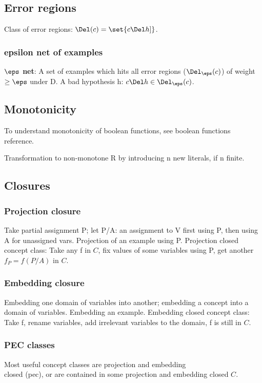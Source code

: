 \documentclass[oneside, article]{memoir}
\begin{document}
\subsection{Error regions}
Class of error regions: $\Del(c)=\set{c \Del h]}$.

\subsubsection{epsilon net of examples}
\textbf{$\eps$ net}: A set of examples which hits all error regions ($\Del_{\eps}(c)$) of weight $\geq \eps$ under D. A bad hypothesis h: $c \Del h \in \Del_{\eps}(c)$.

\subsection{Monotonicity}
To understand monotonicity of boolean functions, see boolean functions reference.

Transformation to non-monotone R by introducing n new literals, if n finite.

\subsection{Closures}
\subsubsection{Projection closure}
Take partial assignment P; let P/A: an assignment to V first using P, then using A for unassigned vars. Projection of an example using P. Projection closed concept class: Take any f in $C$, fix values of some variables using P, get another $f_P=f(P/A)$ in $C$.

\subsubsection{Embedding closure}
Embedding one domain of variables into another; embedding a concept into a domain of variables. Embedding an example. Embedding closed concept class: Take f, rename variables, add irrelevant variables to the domai$n$, f is still in $C$.

\subsubsection{PEC classes}
Most useful concept classes are projection and embedding \\
closed (pec), or are contained in some projection and embedding closed $C$.
\end{document}

